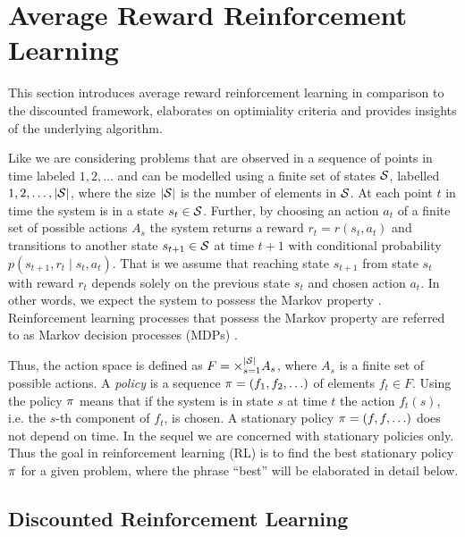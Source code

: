 \documentclass[envcountsame]{llncs}
\newcommand\MS[2][r]{\ifx t#1 \textcolor{blue}{[\textbf{MS:} #2]}
  \else \begin{center}\textcolor{blue}{\textbf{MS:} #2} \end{center} \fi}
\begin{document}
\section{Average Reward Reinforcement Learning}
\label{sec:Average_Reward_Reinforcement_Learning}

This section introduces average reward reinforcement learning in comparison to the discounted
framework, elaborates on optimiality criteria and provides insights of the underlying algorithm.

Like \cite{MillerVeinott1969} we are considering problems that are observed in a sequence of points
in time labeled \(1,2,\ldots\) and can be modelled using a finite set of states \(\mathcal{S}\),
labelled \(1,2,\ldots,\lvert{\mathcal{S}}\rvert\), where the size \(\lvert{\mathcal{S}}\rvert\) is the number of elements
in \(\mathcal{S}\). At each point $t$ in time the system is in a state \(s_{t} \in \mathcal{S}\). Further,
by choosing an action $a_{t}$ of a finite set of possible actions \(A_{s}\) the system returns a
reward $r_{t} = r(s_{t}, a_{t})$ and transitions to another state \(s_{t+1} \in \mathcal{S}\) at time
\(t+1\) with conditional probability \(p(s_{t+1}, r_{t} \mid s_{t}, a_{t})\). That is we assume that
reaching state \(s_{t+1}\) from state \(s_{t}\) with reward \(r_{t}\) depends solely on the previous
state \(s_{t}\) and chosen action \(a_{t}\). In other words, we expect the system to possess the
Markov property \citep[p.63]{sutton1998introduction}. Reinforcement learning processes that possess
the Markov property are referred to as Markov decision processes (MDPs)
\citep[p.66]{sutton1998introduction}.

Thus, the action space is defined as \(F = \times_{s=1}^{\lvert{\mathcal{S}}\rvert} A_{s}\), where \(A_{s}\) is a
finite set of possible actions. A \emph{policy} is a sequence \(\pi = (f_{1},f_{2},\ldots)\) of
elements \(f_{t} \in F\). Using the policy \(\pi\) means that if the system is in state \(s\) at
time \(t\) the action \(f_{t}(s)\), i.e.%
the \(s\)-th component of \(f_{t}\), is chosen. A stationary policy \(\pi = (f,f,\ldots)\) does not
depend on time. In the sequel we are concerned with stationary policies only. Thus the goal in
reinforcement learning (RL) is to find the best stationary policy \(\pi\) for a given problem,
where the phrase ``best'' will be elaborated in detail below.


\subsection{Discounted Reinforcement Learning}
\label{subsec:Discounted_Reinforcement_Learning}
\end{document}
